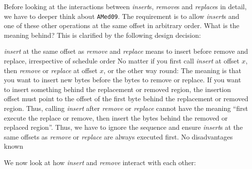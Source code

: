 Before looking at the interactions between \emph{insert}s, \emph{remove}s and \emph{replace}s in detail, we have to deeper think about \texttt{AMed09}. The requirement is to allow \emph{insert}s and one of these other operations at the same offset in arbitrary order. What is the meaning behind? This is clarified by the following design decision:

{%
\emph{insert} at the same offset as \emph{remove} and \emph{replace} means to insert before remove and replace, irrespective of schedule order
}
{%
No matter if you first call \emph{insert} at offset $x$, then \emph{remove} or \emph{replace} at offset $x$, or the other way round: The meaning is that you want to insert new bytes before the bytes to remove or replace.
}
{%
If you want to insert something behind the replacement or removed region, the insertion offset must point to the offset of the first byte behind the replacement or removed region. Thus, calling \emph{insert} after \emph{remove} or \emph{replace} cannot have the meaning ``first execute the replace or remove, then insert the bytes behind the removed or replaced region''. Thus, we have to ignore the sequence and ensure \emph{insert}s at the same offsets as \emph{remove} or \emph{replace} are always executed first.
}
{%
No disadvantages known
}

We now look at how \emph{insert} and \emph{remove} interact with each other:

